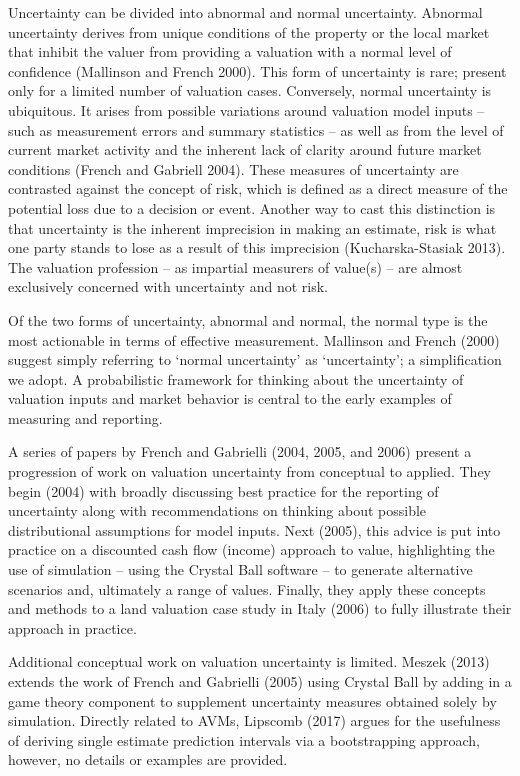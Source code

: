 \documentclass[colTwo]{format}
\theoremstyle{definition}
\begin{document}
Uncertainty can be divided into abnormal and normal uncertainty.  Abnormal uncertainty derives from unique conditions of the property or the local market that inhibit the valuer from providing a valuation with a normal level of confidence (Mallinson and French 2000).  This form of uncertainty is rare; present only for a limited number of valuation cases.  Conversely, normal uncertainty is ubiquitous.  It arises from possible variations around valuation model inputs -- such as measurement errors and summary statistics -- as well as from the level of current market activity and the inherent lack of clarity around future market conditions (French and Gabriell 2004). These measures of uncertainty are contrasted against the concept of risk, which is defined as a direct measure of the potential loss due to a decision or event.  Another way to cast this distinction is that uncertainty is the inherent imprecision in making an estimate, risk is what one party stands to lose as a result of this imprecision (Kucharska-Stasiak 2013).  The valuation profession -- as impartial measurers of value(s) -- are almost exclusively concerned with uncertainty and not risk.

Of the two forms of uncertainty, abnormal and normal, the normal type is the most actionable in terms of effective measurement.  Mallinson and French (2000) suggest simply referring to ‘normal uncertainty’ as ‘uncertainty’; a simplification we adopt.  A probabilistic framework for thinking about the uncertainty of valuation inputs and market behavior is central to the early examples of measuring and reporting.  

A series of papers by French and Gabrielli (2004, 2005, and 2006) present a progression of work on valuation uncertainty from conceptual to applied. They begin (2004) with broadly discussing best practice for the reporting of uncertainty along with recommendations on thinking about possible distributional assumptions for model inputs. Next (2005), this advice is put into practice on a discounted cash flow (income) approach to value, highlighting the use of simulation -- using the Crystal Ball software -- to generate alternative scenarios and, ultimately a range of values.  Finally, they apply these concepts and methods to a land valuation case study in Italy (2006) to fully illustrate their approach in practice. 

Additional conceptual work on valuation uncertainty is limited.  Meszek (2013) extends the work of French and Gabrielli (2005) using Crystal Ball by adding in a game theory component to supplement uncertainty measures obtained solely by simulation.  Directly related to AVMs, Lipscomb (2017) argues for the usefulness of deriving single estimate prediction intervals via a bootstrapping approach, however, no details or examples are provided. 
\end{document}
